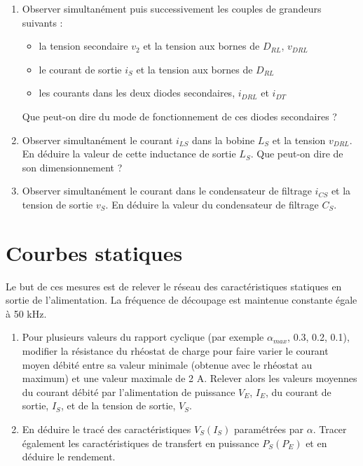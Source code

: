 \begin{enumerate}
\item Observer simultanément puis successivement les couples de grandeurs suivants :
\begin{itemize}
\item la tension secondaire $v_2$ et la tension aux bornes de $D_{RL}$, $v_{DRL}$
\item le courant de sortie $i_S$ et la tension aux bornes de $D_{RL}$
\item les courants dans les deux diodes secondaires, $i_{DRL}$ et $i_{DT}$
\end{itemize}

Que peut-on dire du mode de fonctionnement de ces diodes secondaires ?

\item Observer simultanément le courant $i_{LS}$ dans la bobine $L_S$ et la tension $v_{DRL}$. En déduire la valeur de cette inductance de sortie $L_S$. Que peut-on dire de son dimensionnement ?

\item Observer simultanément le courant dans le condensateur de filtrage $i_{CS}$ et la tension de sortie $v_S$. En déduire la valeur du condensateur de filtrage $C_S$.

\end{enumerate}

\section{Courbes statiques}

Le but de ces mesures est de relever le réseau des caractéristiques statiques en sortie de l’alimentation. La fréquence de découpage est maintenue constante égale à 50 kHz.

\begin{enumerate}
\item Pour plusieurs valeurs du rapport cyclique (par exemple $\alpha_{max}$, 0.3, 0.2, 0.1), modifier la résistance du rhéostat de charge pour faire varier le courant moyen débité entre sa valeur minimale (obtenue avec le rhéostat au maximum) et une valeur maximale de 2 A. Relever alors les valeurs moyennes du courant débité par l’alimentation de puissance $V_E$, $I_E$, du courant de sortie, $I_S$, et de la tension de sortie, $V_S$.


\item En déduire le tracé des caractéristiques $V_S(I_S)$ paramétrées par $\alpha$. Tracer également les caractéristiques de transfert en puissance $P_S(P_E)$ et en déduire le rendement.
\end{enumerate}
